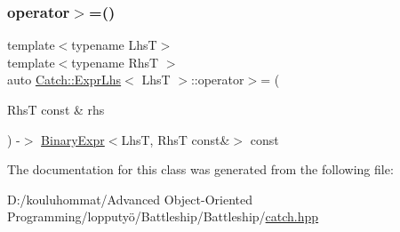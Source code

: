 \mbox{\label{class_catch_1_1_expr_lhs_aff594ae5b957105c517a6257d2e730f0}} 
\subsubsection{\texorpdfstring{operator$>$=()}{operator>=()}}
{\footnotesize\ttfamily template$<$typename LhsT$>$ \\
template$<$typename RhsT $>$ \\
auto \mbox{\hyperlink{class_catch_1_1_expr_lhs}{Catch\+::\+Expr\+Lhs}}$<$ LhsT $>$\+::operator$>$= (\begin{DoxyParamCaption}\item[{RhsT const \&}]{rhs }\end{DoxyParamCaption}) -\/$>$ \mbox{\hyperlink{class_catch_1_1_binary_expr}{Binary\+Expr}}$<$LhsT, RhsT const\&$>$ const \hspace{0.3cm}{\ttfamily [inline]}}



The documentation for this class was generated from the following file\+:\begin{DoxyCompactItemize}
\item 
D\+:/kouluhommat/\+Advanced Object-\/\+Oriented Programming/lopputyö/\+Battleship/\+Battleship/\mbox{\hyperlink{catch_8hpp}{catch.\+hpp}}\end{DoxyCompactItemize}
